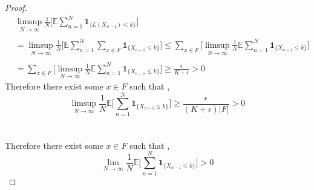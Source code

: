 \documentclass[a4paper,10pt,english]{article}
\begin{document}
\begin{proof}
\begin{align*}
& \limsup_{N\rightarrow \infty}\frac{1}{N} \Bigg[\mathbb{E}\sum_{n=1}^{N} \boldsymbol{1}_{\{L(X_{n-1})\leq k\}}\Bigg]\\\\
&=\limsup_{N\rightarrow \infty}\frac{1}{N} \Bigg[\mathbb{E}\sum_{n=1}^{N}\sum_{x \in F} \boldsymbol{1}_{\{X_{n-1}\leq k\}}\Bigg] \leq \sum_{x \in F} \Bigg[ \limsup_{N\rightarrow \infty}\frac{1}{N} \mathbb{E}\sum_{n=1}^{N} \boldsymbol{1}_{\{X_{n-1}\leq k\}}\Bigg]\\\\ 
&=\sum_{x \in F} \Bigg[ \limsup_{N\rightarrow \infty}\frac{1}{N} \mathbb{E}\sum_{n=1}^{N} \boldsymbol{1}_{\{X_{n-1}\leq k\}}\Bigg] \geq \frac{\epsilon}{K+\epsilon}>0
\end{align*}
Therefore there exist some $x \in F$ such that ,
\[\limsup_{N\rightarrow \infty}\frac{1}{N} \mathbb{E}\Bigg[ \sum_{n=1}^{N} \boldsymbol{1}_{\{X_{n-1}\leq k\}}\Bigg] \geq \frac{\epsilon}{(K+\epsilon)|F|}>0\]\\\\
Therefore there exist some $x \in F$ such that ,
\[\lim_{N\rightarrow \infty}\frac{1}{N} \mathbb{E}\Bigg[\sum_{n=1}^{N} \boldsymbol{1}_{\{X_{n-1}\leq k\}}\Bigg] >0\]
\end{proof}
\end{document}
